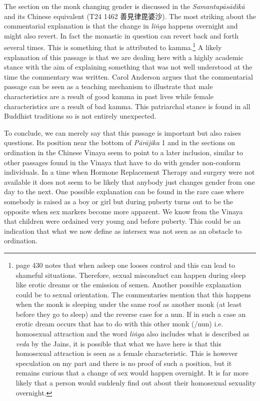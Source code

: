 The section on the monk changing gender is discussed in the {\em Samantapāsādikā} and its Chinese equivalent (T24 1462 善見律毘婆沙). The most striking about the commentarial explanation is that the change in {\em liṅga} happens overnight and might also revert. In fact the monastic in question can revert back and forth several times. This is something that is attributed to kamma.\footnote{\cite{heirman} page 430 notes that when asleep one looses control and this can lead to shameful situations. Therefore, sexual misconduct can happen during sleep like erotic dreams or the emission of semen. Another possible explanation could be to sexual orientation. The commentaries mention that this happens when the monk is sleeping under the same roof as another monk (at least before they go to sleep) and the reverse case for a nun. If in such a case an erotic dream occurs that has to do with this other monk (/nun) i.e. homosexual attraction and the word {\em liṅga} also includes what is described as {\em veda} by the Jains, it is possible that what we have here is that this homosexual attraction is seen as a female characteristic. This is however speculation on my part and there is no proof of such a position, but it remains curious that a change of sex would happen overnight. It is far more likely that a person would suddenly find out about their homosexual sexuality overnight.} A likely explanation of this passage is that we are dealing here with a highly academic stance with the aim of explaining something that was not well understood at the time the commentary was written. Carol Anderson argues that the commentarial passage can be seen as a teaching mechanism to illustrate that male characteristics are a result of good kamma in past lives while female characteristics are a result of bad kamma. This patriarchal stance is found in all Buddhist traditions so is not entirely unexpected. 

To conclude, we can merely say that this passage is important but also raises questions. Its position near the bottom of {\em Pārājika} 1 and in the sections on ordination in the Chinese Vinaya seem to point to a later inclusion, similar to other passages found in the Vinaya that have to do with gender non-conform individuals. In a time when Hormone Replacement Therapy and surgery were not available it does not seem to be likely that anybody just changes gender from one day to the next. One possible explanation can be found in the rare case where somebody is raised as a boy or girl but during puberty turns out to be the opposite when sex markers become more apparent. We know from the Vinaya that children were ordained very young and before puberty. This could be an indication that what we now define as intersex was not seen as an obstacle to ordination.

